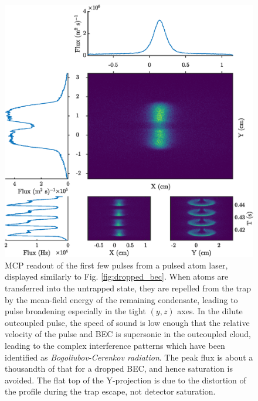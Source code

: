 	 \newpage
	 \begin{figure}
	 	\centering
	 	\includegraphics[width=\textwidth]{fig/apparatus/dropped_pal}
	 	\caption{MCP readout of the first few pulses from a pulsed atom laser, displayed similarly to Fig. \ref{fig:dropped_bec}. When atoms are transferred into the untrapped state, they are repelled from the trap by the mean-field energy of the remaining condensate, leading to pulse broadening especially in the tight $(y,z)$ axes. In the dilute outcoupled pulse, the speed of sound is low enough that the relative velocity of the pulse and BEC is supersonic in the outcoupled cloud, leading to the complex interference patterns which have been identified as \emph{Bogoliubov-Cerenkov radiation}\cite{Henson18_BCR}. The peak flux is about a thousandth of that for a dropped BEC, and hence saturation is avoided.
	 	The flat top of the Y-projection is due to the distortion of the profile during the trap escape, not detector saturation.}
	 	\label{fig:dropped_pal}
	 \end{figure}
	 \newpage

